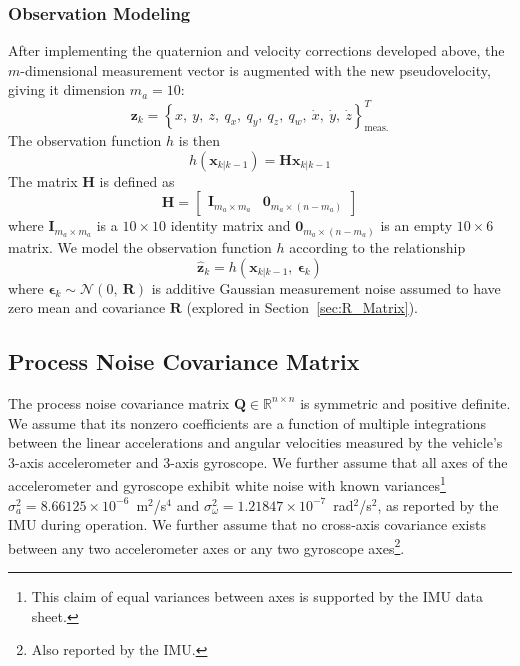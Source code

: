\subsubsection{Observation Modeling}

After implementing the quaternion and velocity corrections developed above, the $m$-dimensional measurement vector is augmented with the new pseudovelocity, giving it dimension $m_{a} = 10$:
%
\begin{equation}
\mathbf{z}_{k} = \left\lbrace x,\ y,\ z,\ q_{x},\ q_{y},\ q_{z},\ q_{w},\ \dot{x},\ \dot{y},\ \dot{z} \right\rbrace ^{T} _{\text{meas.}} 
\end{equation}
%
The observation function $h$ is then
%
\begin{equation}
h \left( \mathbf{x}_{k | k-1} \right) = \mathbf{H} \mathbf{x}_{k | k-1}
\end{equation}
%
The matrix $\mathbf{H}$ is defined as
%
\begin{equation}
\mathbf{H} = 
\begin{bmatrix}
\mathbf{I}_{m_{a} \times m_{a}} & \mathbf{0}_{m_{a} \times \left(n-m_{a}\right)}
\end{bmatrix}
\end{equation}
%
where $\mathbf{I}_{m_{a} \times m_{a}}$ is a $10 \times 10$ identity matrix and $\mathbf{0}_{m_{a} \times \left(n-m_{a}\right)}$ is an empty $10 \times 6$ matrix. We model the observation function $h$ according to the relationship
%
\begin{equation}
\hat{\mathbf{z}}_{k} = h \left( \mathbf{x}_{k | k-1},\ \bm{\epsilon}_{k} \right)
\end{equation}
%
where $\bm{\epsilon}_{k} \sim \mathcal{N} \left( 0,\ \mathbf{R} \right)$ is additive Gaussian measurement noise assumed to have zero mean and covariance $\mathbf{R}$ (explored in Section~\ref{sec:R_Matrix}).

\subsection{Process Noise Covariance Matrix} \label{sec:Q_Matrix}

The process noise covariance matrix $\mathbf{Q} \in \mathbb{R}^{n \times n}$ is symmetric and positive definite. We assume that its nonzero coefficients are a function of multiple integrations between the linear accelerations and angular velocities measured by the vehicle's 3-axis accelerometer and 3-axis gyroscope. We further assume that all axes of the accelerometer and gyroscope exhibit white noise with known variances\footnote{This claim of equal variances between axes is supported by the IMU data sheet.} $\sigma_{a}^{2} = 8.66125 \times 10^{-6}$~m$^{2}$/s$^{4}$ and $\sigma_{\omega}^{2} = 1.21847 \times 10^{-7}$~rad$^{2}$/s$^{2}$, as reported by the IMU during operation. We further assume that no cross-axis covariance exists between any two accelerometer axes or any two gyroscope axes\footnote{Also reported by the IMU.}.

